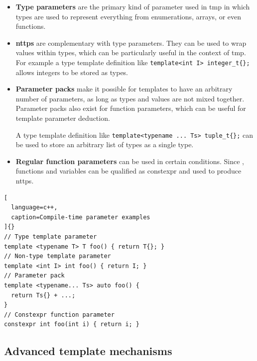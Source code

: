 \documentclass[../main]{subfiles}
\begin{document}
\begin{itemize}

  \item

\textbf{Type parameters} are the primary kind of parameter used in \gls{tmp}
in which types are used to represent everything from enumerations, arrays,
or even functions.

  \item

\textbf{\glspl{nttp}} are complementary with type parameters.
They can be used to wrap values within types, which can be particularly useful
in the context of \gls{tmp}. For example a type template definition like
\lstinline|template<int I> integer_t{};| allows integers to be stored as types.

  \item

\textbf{Parameter packs} make it possible for templates to have an
arbitrary number of parameters, as long as types and values
are not mixed together. Parameter packs also exist for function parameters,
which can be useful for template parameter deduction.

A type template definition like
\lstinline|template<typename ... Ts> tuple_t{};| can be used to store an
arbitrary list of types as a single type.

  \item

\textbf{Regular function parameters} can be used in certain conditions.
Since , functions and variables can be qualified as \gls{constexpr}
and used to produce \glspl{nttp}.

\end{itemize}

\begin{lstlisting}[
  language=c++,
  caption=Compile-time parameter examples
]{}
// Type template parameter
template <typename T> T foo() { return T{}; }
// Non-type template parameter
template <int I> int foo() { return I; }
// Parameter pack
template <typename... Ts> auto foo() {
  return Ts{} + ...;
}
// Constexpr function parameter
constexpr int foo(int i) { return i; }
\end{lstlisting}

\subsection{
  Advanced \cpp template mechanisms
}
\end{document}
